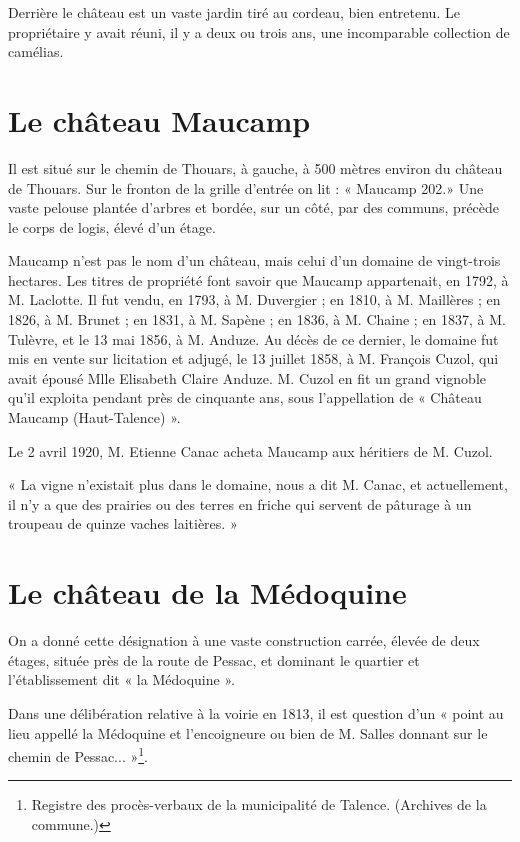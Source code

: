 Derrière le château est un vaste jardin tiré au cordeau, bien entretenu. Le propriétaire y avait réuni, il y a deux ou trois ans, une incomparable collection de camélias.

\section{Le château Maucamp}

Il est situé sur le chemin de Thouars, à gauche, à 500 mètres environ du château de Thouars. Sur le fronton de la grille d'entrée on lit : « Maucamp 202.» Une vaste pelouse plantée d'arbres et bordée, sur un côté, par des communs, précède le corps de logis, élevé d'un étage.

Maucamp n'est pas le nom d'un château, mais celui d'un domaine de vingt-trois hectares. Les titres de propriété font savoir que Maucamp appartenait, en 1792, à M. Laclotte. Il fut vendu, en 1793, à M. Duvergier ; en 1810, à M. Maillères ; en 1826, à M. Brunet ; en 1831, à M. Sapène ; en 1836, à M. Chaine ; en 1837, à M. Tulèvre, et le 13 mai 1856, à M. Anduze. Au décès de ce dernier, le domaine fut mis en vente sur licitation et adjugé, le 13 juillet 1858, à M. François Cuzol, qui avait épousé Mlle Elisabeth Claire Anduze. M. Cuzol en fit un grand vignoble qu'il exploita pendant près de cinquante ans, sous l'appellation de « Château Maucamp (Haut-Talence) ».

Le 2 avril 1920, M. Etienne Canac acheta Maucamp aux héritiers de M. Cuzol.

« La vigne n'existait plus dans le domaine, nous a dit M. Canac, et actuellement, il n'y a que des prairies ou des terres en friche qui servent de pâturage à un troupeau de quinze vaches laitières. »

\section{Le château de la Médoquine}

On a donné cette désignation à une vaste construction carrée, élevée de deux étages, située près de la route de Pessac, et dominant le quartier et l'établissement dit « la Médoquine ».

Dans une délibération relative à la voirie en 1813, il est question d'un « point au lieu appellé la Médoquine et l'encoigneure ou bien de M. Salles donnant sur le chemin de Pessac... »\footnote{Registre des procès-verbaux de la municipalité de Talence. (Archives de la commune.)}.

